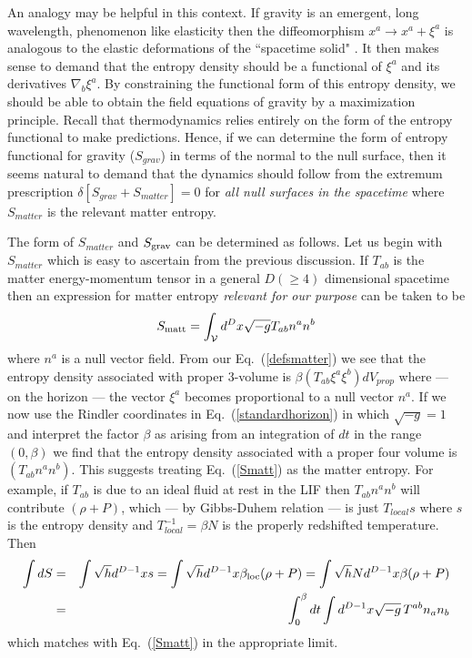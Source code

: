 \documentclass[12pt]{iopart}
\def\eq#1{{Eq.~(\ref{#1})}}
\def\g{\sqrt{-g}\,}
\newcommand{\Cal}[1]{\ensuremath{\mathcal{#1}}}
\begin{document}
An analogy may be helpful in this context.
If  gravity is an emergent, long wavelength, phenomenon like elasticity  then the diffeomorphism $x^a\to x^a+\xi^a$ is analogous to  the elastic deformations of the ``spacetime solid"
\cite{elasticgravity}. It then makes sense to demand that the entropy density should be a functional of $\xi^a$ and its derivatives $\nabla_b \xi^a$. By constraining 
the functional form of this entropy density, we should be able to obtain the field equations of gravity by a maximization principle.
Recall that thermodynamics relies entirely on the form of the entropy functional to make predictions.
Hence, if we can determine  the  form of entropy functional for gravity  ($S_{grav}$) in terms of the normal to the null surface, then it seems
 natural to demand that  the dynamics should follow from the extremum prescription
$\delta[S_{grav}+S_{matter}]=0$ for \textit{all null surfaces in the spacetime} where $S_{matter}$ is the relevant  matter entropy. 


The form of $S_{matter}$ and $S_{\rm grav}$ can be determined as follows.
Let us begin with $S_{matter}$ which  is easy to ascertain from the previous discussion.
If $T_{ab}$ is the matter energy-momentum tensor in a general $D(\ge 4)$ dimensional spacetime then an expression for matter entropy \textit{relevant for our purpose} can be taken to be 
\begin{equation}
S_{\rm matt}=\int_\Cal{V}{d^Dx\sqrt{-g}}
      T_{ab}n^an^b
      \label{Smatt}
\end{equation} 
where $n^a$ is a null vector field.  From our \eq{defsmatter} we see that the entropy density associated with proper 3-volume is $\beta(T_{ab}\xi^a\xi^b)dV_{prop}$ where --- on the horizon --- the vector $\xi^a$ becomes proportional to a null vector $n^a$. 
If we now use the Rindler coordinates in \eq{standardhorizon} in which $\sqrt{-g}=1$ and 
interpret the factor $\beta$ as arising from an integration of $dt$ in the range $(0,\beta)$ we find that the entropy density associated with a proper four volume is $(T_{ab}n^an^b)$. This suggests treating \eq{Smatt} as the matter entropy. 
 For example, if $T_{ab}$ is due to an ideal fluid at rest in  the LIF then $T_{ab}n^an^b$ will contribute $(\rho+P)$, which --- by Gibbs-Duhem relation --- is just $T_{local}s$ where $s$ is the entropy density and $T_{local}^{-1}=\beta N$ is the properly redshifted temperature. Then
 \begin{eqnarray}
 \label{intlim}
\int dS&=&\int\sqrt{h}d^{D-1}x s=\int\sqrt{h}d^{D-1}x\beta_{\rm loc}(\rho+P)=\int\sqrt{h}Nd^{D-1}x \beta (\rho+P)\nonumber\\
&=&\int_0^\beta dt \int d^{D-1}x\g T^{ab}n_an_b
\end{eqnarray} 
which matches with \eq{Smatt} in the appropriate limit.
\end{document}
